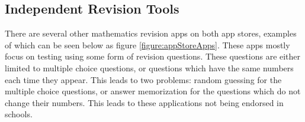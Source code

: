 \documentclass{article}
\begin{document}
\subsection{Independent Revision Tools}

There are several other mathematics revision apps on both app stores, examples of which can be seen below as figure \ref{figure:appStoreApps}. These apps mostly focus on testing using some form of revision questions. These questions are either limited to multiple choice questions, or questions which have the same numbers each time they appear. This leads to two problems: random guessing for the multiple choice questions, or answer memorization for the questions which do not change their numbers. This leads to these applications not being endorsed in schools. \par
\end{document}
